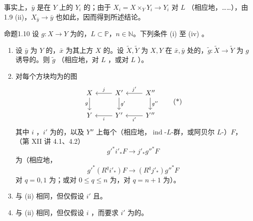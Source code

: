 事实上，$\bar y$ 是在 $Y$ 上的 $Y_i$ 的；由于 $X_i=X\times_Y Y_i\to Y_i$ 对 $L$ （相应地，……），由 1.9 (ii)，$X_{\bar y}\to\bar y$ 也如此，因而得到所述结论。
\begin{SGAresult}{命题}{1.10}
设 $g:X\to Y$ 为的，$L\subset\mathbb P$，$n\in\mathbb N$。下列条件 (i) 至 (iv) 。
\begin{enumerate}
\item[(i)] 设 $\bar y$ 为 $Y$ 的，$\bar x$ 为其上方 $X$ 的。设 $\widetilde X,\widetilde Y$ 为 $X,Y$ 在 $\bar x,\bar y$ 处的，$\widetilde g:\widetilde X\to\widetilde Y$ 为 $g$ 诱导的。则 $\widetilde g$ （相应地，对 $L$ ，或对 $L$ ）。
\item[(ii)] 对每个方块均为的图
\[
\begin{tikzcd}
X\arrow[d,"g"']&X'\arrow[l,"j"']\arrow[d,"g'"]&X''\arrow[l,"j'"']\arrow[d,"g''"]\\
Y&Y'\arrow[l,"i"]&Y''\arrow[l,"i'"]
\end{tikzcd}\tag{*}
\]
其中 $i$ ，$i'$ 为的，以及 $Y''$ 上每个（相应地，$\operatorname{ind}$-$L$-群，或阿贝尔 $L$-）$F$，（第 XII 讲 4.1、4.2）
\[g'^*i'_*F\longrightarrow j'_*g''^*F\]
为（相应地，
\[g'^*(R^qi'_*)F\longrightarrow(R^qj'_*)g''^*F\]
对 $q=0,1$ 为；或对 $0\leq q\leq n$ 为，对 $q=n+1$ 为）。
\item[(iii)] 与 (ii) 相同，但仅假设 $i'$ 且。
\item[(iv)] 与 (ii) 相同，但仅假设 $i$ ，而要求 $i'$ 为的。
\end{enumerate}
\end{SGAresult}
